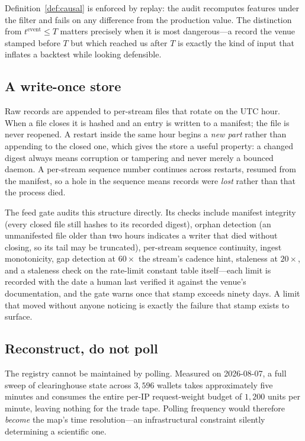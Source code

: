\documentclass[11pt,a4paper]{article}
\theoremstyle{definition}
\theoremstyle{plain}
\begin{document}
Definition~\ref{def:causal} is enforced by replay: the audit recomputes features under the filter and
fails on any difference from the production value. The distinction from $t^{\text{event}} \le T$
matters precisely when it is most dangerous---a record the venue stamped before $T$ but which reached
us after $T$ is exactly the kind of input that inflates a backtest while looking defensible.

\subsection{A write-once store}

Raw records are appended to per-stream files that rotate on the UTC hour. When a file closes it is
hashed and an entry is written to a manifest; the file is never reopened. A restart inside the same
hour begins a \emph{new part} rather than appending to the closed one, which gives the store a useful
property: a changed digest always means corruption or tampering and never merely a bounced daemon. A
per-stream sequence number continues across restarts, resumed from the manifest, so a hole in the
sequence means records were \emph{lost} rather than that the process died.

The feed gate audits this structure directly. Its checks include manifest integrity (every closed
file still hashes to its recorded digest), orphan detection (an unmanifested file older than two
hours indicates a writer that died without closing, so its tail may be truncated), per-stream
sequence continuity, ingest monotonicity, gap detection at $60\times$ the stream's cadence hint,
staleness at $20\times$, and a staleness check on the rate-limit constant table itself---each limit
is recorded with the date a human last verified it against the venue's documentation, and the gate
warns once that stamp exceeds ninety days. A limit that moved without anyone noticing is exactly the
failure that stamp exists to surface.

\subsection{Reconstruct, do not poll}

The registry cannot be maintained by polling. Measured on 2026-08-07, a full sweep of clearinghouse
state across $3{,}596$ wallets takes approximately five minutes and consumes the entire per-IP
request-weight budget of $1{,}200$ units per minute, leaving nothing for the trade tape. Polling
frequency would therefore \emph{become} the map's time resolution---an infrastructural constraint
silently determining a scientific one.
\end{document}
